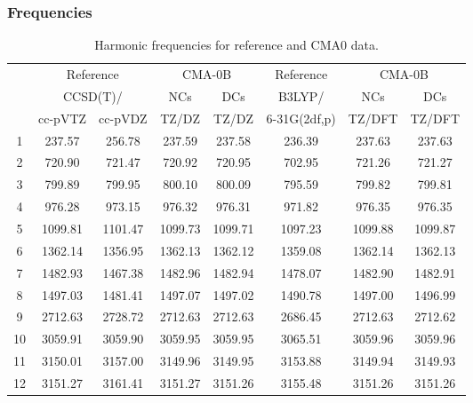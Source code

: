 \documentclass[10pt,oneside]{article}
\begin{document}
\subsubsection*{Frequencies}
\begin{table}[h!]
\centering
\caption{Harmonic frequencies for reference and CMA0 data.}
\begin{tabular}{cccccccc}
\toprule
{} & \multicolumn{2}{c}{Reference} & \multicolumn{2}{c}{CMA-0B} &    Reference & \multicolumn{2}{c}{CMA-0B} \\
{} & \multicolumn{2}{c}{CCSD(T)/} &     NCs &     DCs &       B3LYP/ &     NCs &     DCs \\
{} &   cc-pVTZ & cc-pVDZ &   TZ/DZ &   TZ/DZ & 6-31G(2df,p) &  TZ/DFT &  TZ/DFT \\
\midrule
1  &    237.57 &  256.78 &  237.59 &  237.58 &       236.39 &  237.63 &  237.63 \\
2  &    720.90 &  721.47 &  720.92 &  720.95 &       702.95 &  721.26 &  721.27 \\
3  &    799.89 &  799.95 &  800.10 &  800.09 &       795.59 &  799.82 &  799.81 \\
4  &    976.28 &  973.15 &  976.32 &  976.31 &       971.82 &  976.35 &  976.35 \\
5  &   1099.81 & 1101.47 & 1099.73 & 1099.71 &      1097.23 & 1099.88 & 1099.87 \\
6  &   1362.14 & 1356.95 & 1362.13 & 1362.12 &      1359.08 & 1362.14 & 1362.13 \\
7  &   1482.93 & 1467.38 & 1482.96 & 1482.94 &      1478.07 & 1482.90 & 1482.91 \\
8  &   1497.03 & 1481.41 & 1497.07 & 1497.02 &      1490.78 & 1497.00 & 1496.99 \\
9  &   2712.63 & 2728.72 & 2712.63 & 2712.63 &      2686.45 & 2712.63 & 2712.62 \\
10 &   3059.91 & 3059.90 & 3059.95 & 3059.95 &      3065.51 & 3059.96 & 3059.96 \\
11 &   3150.01 & 3157.00 & 3149.96 & 3149.95 &      3153.88 & 3149.94 & 3149.93 \\
12 &   3151.27 & 3161.41 & 3151.27 & 3151.26 &      3155.48 & 3151.26 & 3151.26 \\
\bottomrule
\end{tabular}
\end{table}

\clearpage
\end{document}
